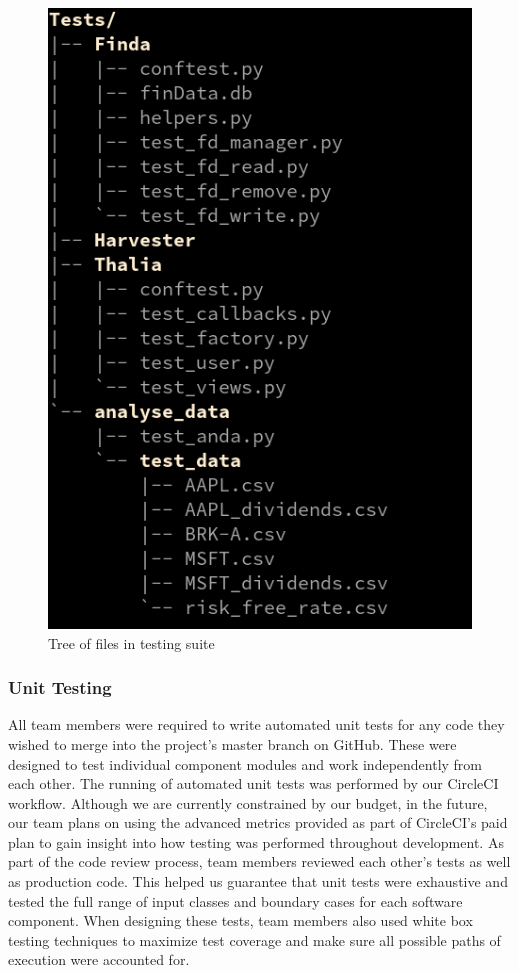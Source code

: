 \documentclass[main.tex]{subfiles}
\begin{document}
\begin{figure}[H]
   \centering
   \includegraphics[scale=0.3]{06Testing/06Pictures/testingSuiteStructure.png}
   \caption{Tree of files in testing suite}
   \label{Testing Suite}
\end{figure}

\subsubsection{Unit Testing}
All team members were required to write automated unit tests for any code they wished to merge into the project’s master branch on GitHub. These were designed to test individual component modules and work independently from each other. The running of automated unit tests was performed by our CircleCI workflow. Although we are currently constrained by our budget, in the future, our team plans on using the advanced metrics provided as part of CircleCI's paid plan to gain insight into how testing was performed throughout development. As part of the code review process, team members reviewed each other's tests as well as production code. This helped us guarantee that unit tests were exhaustive and tested the full range of input classes and boundary cases for each software component. When designing these tests, team members also used white box testing techniques to maximize test coverage and make sure all possible paths of execution were accounted for.
\end{document}
